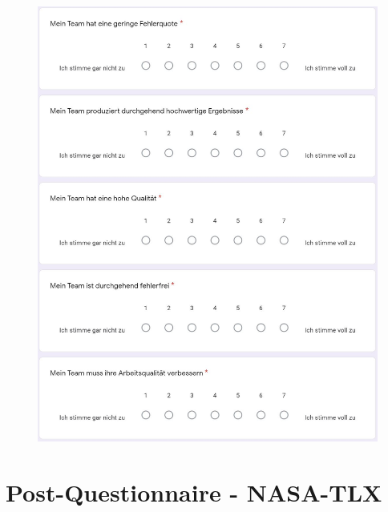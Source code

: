 \documentclass[a4paper,11pt]{article}%
\renewcommand{\\}{\vspace*{0.5\baselineskip} \newline}
\begin{document}
	\begin{figure}[H]
	\centering
		\begin{footnotesize}
			\includegraphics[scale=0.6]{Abbildungen/Fragebogen/Post-Questionnaire/PQTE1}
		\end{footnotesize}
	\end{figure}	

\newpage
\section{Post-Questionnaire - NASA-TLX}
\label{Post-Questionnaire - NASA-TLX}
\end{document}
